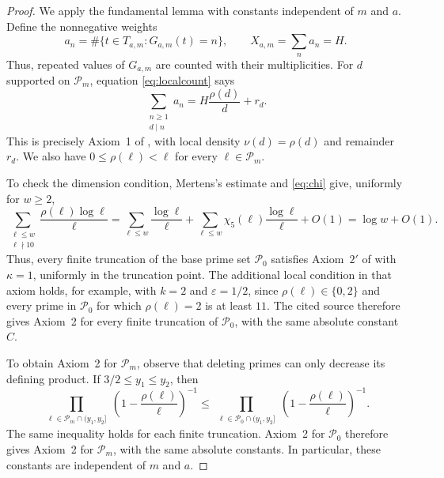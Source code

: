 \documentclass[11pt]{amsart}
\theoremstyle{definition}
\theoremstyle{remark}
\begin{document}
\begin{proof}
We apply the fundamental lemma with constants independent of $m$ and
$a$. Define the nonnegative weights
\[
a_n=\#\{t\in T_{a,m}:G_{a,m}(t)=n\},
\qquad X_{a,m}=\sum_n a_n=H.
\]
Thus, repeated values of $G_{a,m}$ are counted with their multiplicities.
For $d$ supported on $\mathcal P_m$, equation \eqref{eq:localcount} says
\[
\sum_{\substack{n\geq1\\d\mid n}}a_n
=H\frac{\rho(d)}d+r_d.
\]
This is precisely Axiom~1 of \cite[pp.~185--186]{Koukoulopoulos}, with local
density $\nu(d)=\rho(d)$ and remainder $r_d$.  We also have
$0\leq\rho(\ell)<\ell$ for every $\ell\in\mathcal P_m$.

To check the dimension condition, Mertens's estimate and
\eqref{eq:chi} give, uniformly for $w\geq2$,
\begin{equation}\label{eq:weightedrho}
\sum_{\substack{\ell\leq w\\ \ell\nmid10}}
\frac{\rho(\ell)\log\ell}{\ell}
=\sum_{\ell\leq w}\frac{\log\ell}{\ell}
+\sum_{\ell\leq w}\chi_5(\ell)\frac{\log\ell}{\ell}
+O(1)
=\log w+O(1).
\end{equation}
Thus, every finite truncation of the base prime set $\mathcal P_0$ satisfies
Axiom~$2'$ of \cite[p.~188]{Koukoulopoulos} with $\kappa=1$, uniformly in
the truncation point.  The additional local condition in that axiom holds,
for example, with $k=2$ and $\varepsilon=1/2$, since
$\rho(\ell)\in\{0,2\}$ and every prime in $\mathcal P_0$ for which
$\rho(\ell)=2$ is at least $11$.  The cited source therefore gives Axiom~2
for every finite truncation of $\mathcal P_0$, with the same absolute
constant $C$.

To obtain Axiom~2 for $\mathcal P_m$, observe that deleting primes
can only decrease its defining product. If
$3/2\leq y_1\leq y_2$, then
\[
\prod_{\substack{\ell\in\mathcal P_m\cap(y_1,y_2]}}
\left(1-\frac{\rho(\ell)}\ell\right)^{-1}
\leq
\prod_{\substack{\ell\in\mathcal P_0\cap(y_1,y_2]}}
\left(1-\frac{\rho(\ell)}\ell\right)^{-1}.
\]
The same inequality holds for each finite truncation. Axiom~2 for
$\mathcal P_0$ therefore gives Axiom~2 for $\mathcal P_m$, with the
same absolute constants. In particular, these constants are independent
of $m$ and $a$.


\end{proof}
\end{document}
